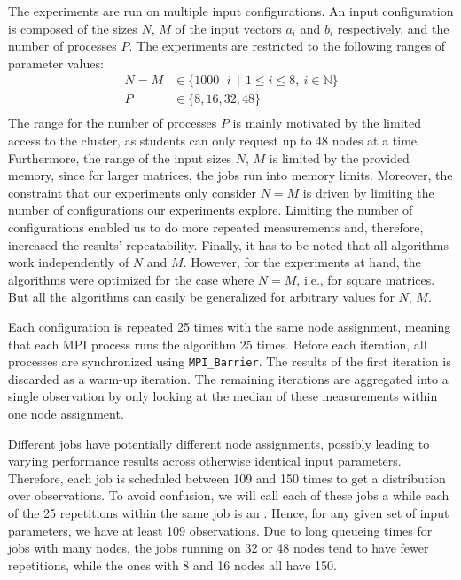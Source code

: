 \documentclass[letterpaper]{article}
\begin{document}
The experiments are run on multiple input configurations. An input configuration is composed of the sizes $N$, $M$ of the input vectors $a_i$ and $b_i$ respectively, and the number of processes $P$. The experiments are restricted to the following ranges of parameter values:\\[-17pt]
\begin{align*}
N = M & \in \{1000\cdot i \ \ |\ \ 1 \leq i \leq 8,\ i \in \mathbb{N}\} \\
P & \in \{8, 16, 32, 48\} \\[-18pt]
\end{align*}
The range for the number of processes $P$ is mainly motivated by the limited access to the cluster, as students can only request up to 48 nodes at a time. Furthermore, the range of the input sizes $N$, $M$ is limited by the provided memory, since for larger matrices, the jobs run into memory limits. Moreover, the constraint that our experiments only consider $N = M$ is driven by limiting the number of configurations our experiments explore. Limiting the number of configurations enabled us to do more repeated measurements and, therefore, increased the results' repeatability. Finally, it has to be noted that all algorithms work independently of $N$ and $M$. However, for the experiments at hand, the algorithms were optimized for the case where $N = M$, i.e., for square matrices. But all the algorithms can easily be generalized for arbitrary values for $N$, $M$.

Each configuration is repeated 25 times with the same node assignment, meaning that each MPI process runs the algorithm 25 times.
Before each iteration, all processes are synchronized using \verb|MPI_Barrier|.
The results of the first iteration is discarded as a warm-up iteration.
The remaining iterations are aggregated into a single observation by only looking at the median of these measurements within one node assignment.

Different jobs have potentially different node assignments, possibly leading to varying performance results across otherwise identical input parameters. Therefore, each job is scheduled between 109 and 150 times to get a distribution over observations. To avoid confusion, we will call each of these jobs a  while each of the 25 repetitions within the same job is an . Hence, for any given set of input parameters, we have at least 109 observations. Due to long queueing times for jobs with many nodes, the jobs running on 32 or 48 nodes tend to have fewer repetitions, while the ones with 8 and 16 nodes all have 150.
\end{document}

